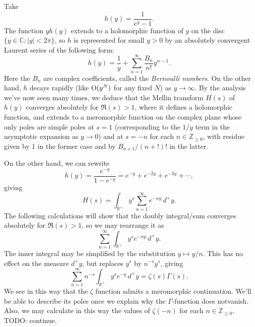 \documentclass[reqno]{amsart}  \numberwithin{theorem}{section} \numberwithin{equation}{section}
\begin{document}
\begin{example}
  Take
  \begin{equation*}
h(y) = \frac{1}{e^y - 1}.
  \end{equation*}
  The function $y h(y)$ extends to a holomorphic function of $y$ on the disc $\{y \in \mathbb{C} : \lvert y \rvert < 2 \pi \}$, so $h$ is represented for small $y > 0$ by an absolutely convergent Laurent series of the following form:
  \begin{equation*}
h(y) = \frac{1}{y} + \sum_{n = 1 }^\infty \frac{B_n  }{ n !} y^{n - 1}.
  \end{equation*}
  Here the $B_n$ are complex coefficients, called the \emph{Bernoulli numbers}.  On the other hand, $h$ decays rapidly (like $\operatorname{O}(y^N)$ for any fixed $N$) as $y \rightarrow \infty$.  By the analysis we've now seen many times, we deduce that the Mellin transform $H(s)$ of $h(y)$ converges absolutely for $\Re(s) > 1$, where it defines a holomorphic function, and extends to a meromorphic function on the complex plane whose only poles are simple poles at $s = 1$ (corresponding to the $1/y$ term in the asymptotic expansion as $y \rightarrow 0$) and at $s = -n$ for each $n \in \mathbb{Z}_{\geq 0}$, with residue given by $1$ in the former case and by $B_{n+1} / (n+!)!$ in the latter.

  On the other hand, we can rewrite
  \begin{equation*}
    h(y) = \frac{e^{- y}}{ 1 - e^{- y}}
    = e^{- y } + e^{- 2 y } + e^{- 3 y} + \dotsb,
  \end{equation*}
  giving
  \begin{equation*}
    H(s) = \int_{\mathbb{R}^+ } y^s \sum_{n = 1 }^\infty e^{- n y } \,d^\times y.
  \end{equation*}
  The following calculations will show that the doubly integral/sum converges absolutely for $\Re(s) > 1$, so we may rearrange it as
  \begin{equation*}
\sum_{n = 1 }^\infty \int_{\mathbb{R}^+ } y^s e^{- n y } \,d^\times y.
  \end{equation*}
  The inner integral may be simplified by the substitution $y \mapsto y /n$.  This has no effect on the measure $d^\times y$, but replaces $y^s$ by $n^{-s} y^s$, giving
  \begin{equation*}
    \sum_{n = 1 }^\infty n^{- s} \int_{\mathbb{R}^+ } y^s e^{- y } \,d^\times y
    = \zeta(s) \Gamma(s).
  \end{equation*}
  We see in this way that the $\zeta$ function admits a meromorphic continuation.  We'll be able to describe its poles once we explain why the $\Gamma$-function does notvanish.  Also, we may calculate in this way the values of $\zeta(-n)$ for each $n \in \mathbb{Z}_{\geq 0}$.  TODO: continue.
\end{example}



{} 
\end{document}
